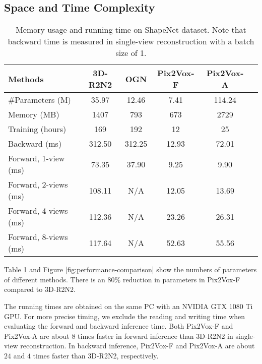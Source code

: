\documentclass[10pt,twocolumn,letterpaper]{article}
\begin{document}
\subsection{Space and Time Complexity}
\begin{table}
  \caption{Memory usage and running time on ShapeNet dataset. Note that backward time is measured in single-view reconstruction with a batch size of 1.}
  \vspace{-2 mm}
  \centering
  \resizebox{\linewidth}{!} {
    \begin{tabular}{lccccc}
    \toprule
    Methods               & 3D-R2N2   & OGN
                          & Pix2Vox-F & Pix2Vox-A \\
    \midrule
    \#Parameters (M)      & 35.97     & 12.46
                          & 7.41      & 114.24 \\
    Memory (MB)           & 1407      & 793
                          & 673       & 2729 \\
    \midrule
    Training (hours)      & 169       & 192
                          & 12        & 25 \\
    Backward (ms)         & 312.50    & 312.25
                          & 12.93     & 72.01 \\
    \midrule
    Forward, 1-view (ms)  & 73.35     & 37.90
                          & 9.25      & 9.90 \\
    Forward, 2-views (ms) & 108.11    & N/A
                          & 12.05     & 13.69 \\
    Forward, 4-views (ms) & 112.36    & N/A
                          & 23.26     & 26.31 \\
    Forward, 8-views (ms) & 117.64    & N/A
                          & 52.63     & 55.56 \\
    \bottomrule
    \end{tabular}
  }
  \label{tab:performance-comparison}
  \vspace{-2 mm}
\end{table}

Table \ref{tab:performance-comparison} and Figure \ref{fig:performance-comparison} show the numbers of parameters of different methods.
There is an $80\%$ reduction in parameters in Pix2Vox-F compared to 3D-R2N2.

The running times are obtained on the same PC with an NVIDIA GTX 1080 Ti GPU.
For more precise timing, we exclude the reading and writing time when evaluating the forward and backward inference time.
Both Pix2Vox-F and Pix2Vox-A are about $8$ times faster in forward inference than 3D-R2N2 in single-view reconstruction.
In backward inference, Pix2Vox-F and Pix2Vox-A are about $24$ and $4$ times faster than 3D-R2N2, respectively.
\end{document}
